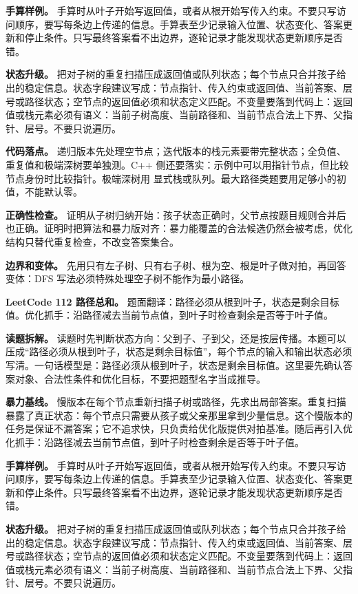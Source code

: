 \textbf{手算样例。} 手算时从叶子开始写返回值，或者从根开始写传入约束。不要只写访问顺序，要写每条边上传递的信息。手算表至少记录输入位置、状态变化、答案更新和停止条件。只写最终答案看不出边界，逐轮记录才能发现状态更新顺序是否错。

\textbf{状态升级。} 把对子树的重复扫描压成返回值或队列状态；每个节点只合并孩子给出的稳定信息。状态字段建议写成：节点指针、传入约束或返回值、当前答案、层号或路径状态；空节点的返回值必须和状态定义匹配。不变量要落到代码上：返回值或栈元素必须有语义：当前子树高度、当前路径和、当前节点合法上下界、父指针、层号。不要只说遍历。

\textbf{代码落点。} 递归版本先处理空节点；迭代版本的栈元素要带完整状态；全负值、重复值和极端深树要单独测。C++ 侧还要落实：示例中可以用指针节点，但比较节点身份时比较指针。极端深树用  显式栈或队列。最大路径类题要用足够小的初值，不能默认零。

\textbf{正确性检查。} 证明从子树归纳开始：孩子状态正确时，父节点按题目规则合并后也正确。证明时把算法和暴力版对齐：暴力能覆盖的合法候选仍然会被考虑，优化结构只替代重复检查，不改变答案集合。

\textbf{边界和变体。} 先用只有左子树、只有右子树、根为空、根是叶子做对拍，再回答变体：DFS 写法必须特殊处理空子树不能作为最小路径。

\noindent\textbf{LeetCode 112 路径总和。} 题面翻译：路径必须从根到叶子，状态是剩余目标值。优化抓手：沿路径减去当前节点值，到叶子时检查剩余是否等于叶子值。

\textbf{读题拆解。} 读题时先判断状态方向：父到子、子到父，还是按层传播。本题可以压成“路径必须从根到叶子，状态是剩余目标值”，每个节点的输入和输出状态必须写清。一句话模型是：路径必须从根到叶子，状态是剩余目标值。这里要先确认答案对象、合法性条件和优化目标，不要把题型名字当成推导。

\textbf{暴力基线。} 慢版本在每个节点重新扫描子树或路径，先求出局部答案。重复扫描暴露了真正状态：每个节点只需要从孩子或父亲那里拿到少量信息。这个慢版本的任务是保证不漏答案；它不追求快，只负责给优化版提供对拍基准。随后再引入优化抓手：沿路径减去当前节点值，到叶子时检查剩余是否等于叶子值。

\textbf{手算样例。} 手算时从叶子开始写返回值，或者从根开始写传入约束。不要只写访问顺序，要写每条边上传递的信息。手算表至少记录输入位置、状态变化、答案更新和停止条件。只写最终答案看不出边界，逐轮记录才能发现状态更新顺序是否错。

\textbf{状态升级。} 把对子树的重复扫描压成返回值或队列状态；每个节点只合并孩子给出的稳定信息。状态字段建议写成：节点指针、传入约束或返回值、当前答案、层号或路径状态；空节点的返回值必须和状态定义匹配。不变量要落到代码上：返回值或栈元素必须有语义：当前子树高度、当前路径和、当前节点合法上下界、父指针、层号。不要只说遍历。

